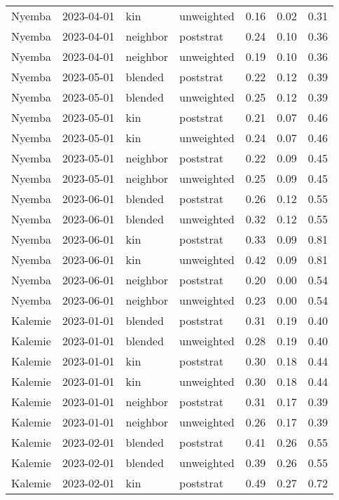 \begin{table}[ht]
\begin{tabular}{llllrrr}
  Nyemba & 2023-04-01 & kin & unweighted & 0.16 & 0.02 & 0.31 \\ 
  Nyemba & 2023-04-01 & neighbor & poststrat & 0.24 & 0.10 & 0.36 \\ 
  Nyemba & 2023-04-01 & neighbor & unweighted & 0.19 & 0.10 & 0.36 \\ 
  Nyemba & 2023-05-01 & blended & poststrat & 0.22 & 0.12 & 0.39 \\ 
  Nyemba & 2023-05-01 & blended & unweighted & 0.25 & 0.12 & 0.39 \\ 
  Nyemba & 2023-05-01 & kin & poststrat & 0.21 & 0.07 & 0.46 \\ 
  Nyemba & 2023-05-01 & kin & unweighted & 0.24 & 0.07 & 0.46 \\ 
  Nyemba & 2023-05-01 & neighbor & poststrat & 0.22 & 0.09 & 0.45 \\ 
  Nyemba & 2023-05-01 & neighbor & unweighted & 0.25 & 0.09 & 0.45 \\ 
  Nyemba & 2023-06-01 & blended & poststrat & 0.26 & 0.12 & 0.55 \\ 
  Nyemba & 2023-06-01 & blended & unweighted & 0.32 & 0.12 & 0.55 \\ 
  Nyemba & 2023-06-01 & kin & poststrat & 0.33 & 0.09 & 0.81 \\ 
  Nyemba & 2023-06-01 & kin & unweighted & 0.42 & 0.09 & 0.81 \\ 
  Nyemba & 2023-06-01 & neighbor & poststrat & 0.20 & 0.00 & 0.54 \\ 
  Nyemba & 2023-06-01 & neighbor & unweighted & 0.23 & 0.00 & 0.54 \\ 
  Kalemie & 2023-01-01 & blended & poststrat & 0.31 & 0.19 & 0.40 \\ 
  Kalemie & 2023-01-01 & blended & unweighted & 0.28 & 0.19 & 0.40 \\ 
  Kalemie & 2023-01-01 & kin & poststrat & 0.30 & 0.18 & 0.44 \\ 
  Kalemie & 2023-01-01 & kin & unweighted & 0.30 & 0.18 & 0.44 \\ 
  Kalemie & 2023-01-01 & neighbor & poststrat & 0.31 & 0.17 & 0.39 \\ 
  Kalemie & 2023-01-01 & neighbor & unweighted & 0.26 & 0.17 & 0.39 \\ 
  Kalemie & 2023-02-01 & blended & poststrat & 0.41 & 0.26 & 0.55 \\ 
  Kalemie & 2023-02-01 & blended & unweighted & 0.39 & 0.26 & 0.55 \\ 
  Kalemie & 2023-02-01 & kin & poststrat & 0.49 & 0.27 & 0.72 \\ 

\end{tabular}
\end{table}
